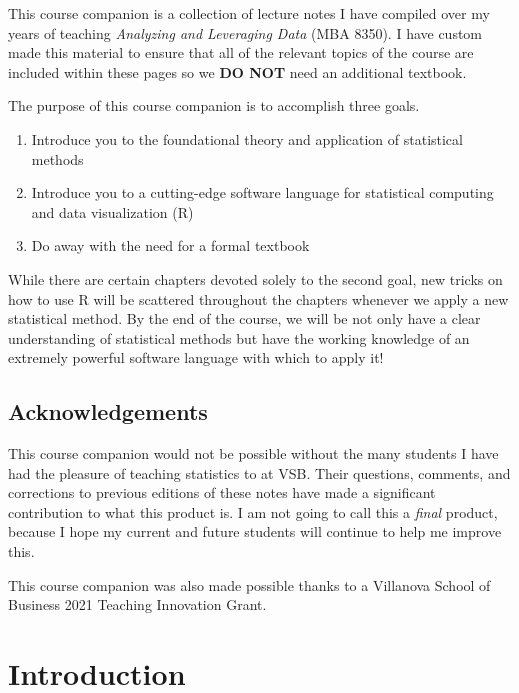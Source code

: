 \documentclass[
]{book}
\begin{document}
This course companion is a collection of lecture notes I have compiled over my years of teaching \emph{Analyzing and Leveraging Data} (MBA 8350). I have custom made this material to ensure that all of the relevant topics of the course are included within these pages so we \textbf{DO NOT} need an additional textbook.

The purpose of this course companion is to accomplish three goals.

\begin{enumerate}
\def\labelenumi{\arabic{enumi}.}
\item
  Introduce you to the foundational theory and application of statistical methods
\item
  Introduce you to a cutting-edge software language for statistical computing and data visualization (R)
\item
  Do away with the need for a formal textbook
\end{enumerate}

While there are certain chapters devoted solely to the second goal, new tricks on how to use R will be scattered throughout the chapters whenever we apply a new statistical method. By the end of the course, we will be not only have a clear understanding of statistical methods but have the working knowledge of an extremely powerful software language with which to apply it!

\hypertarget{acknowledgements}{%
\section*{Acknowledgements}\label{acknowledgements}}

This course companion would not be possible without the many students I have had the pleasure of teaching statistics to at VSB. Their questions, comments, and corrections to previous editions of these notes have made a significant contribution to what this product is. I am not going to call this a \emph{final} product, because I hope my current and future students will continue to help me improve this.

This course companion was also made possible thanks to a Villanova School of Business 2021 Teaching Innovation Grant.

\hypertarget{intro}{%
\chapter{Introduction}\label{intro}}
\end{document}
